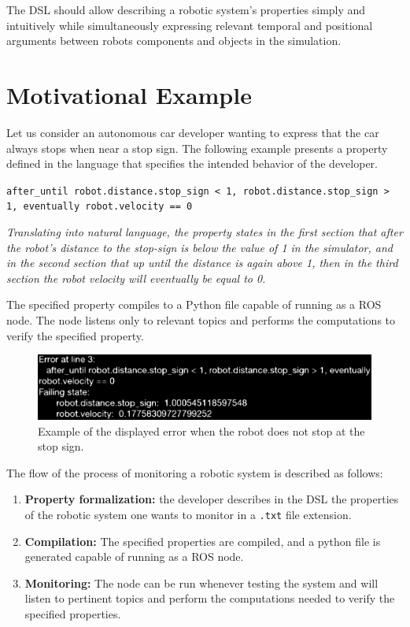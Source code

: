 The DSL should allow describing a robotic system's properties simply and intuitively while simultaneously expressing relevant temporal and positional arguments between robots components and objects in the simulation.


\section{Motivational Example}
\label{sec:motivationalexample}

Let us consider an autonomous car developer wanting to express that the car always stops when near a stop sign. The following example presents a property defined in the language that specifies the intended behavior of the developer.

\texttt{after\_until robot.distance.stop\_sign < 1, robot.distance.stop\_sign > 1, eventually robot.velocity == 0}

\textit{Translating into natural language, the property states in the first section that after the robot's distance to the stop-sign is below the value of 1 in the simulator, and in the second section that up until the distance is again above 1, then in the third section the robot velocity will eventually be equal to 0.}

The specified property compiles to a Python file capable of running as a ROS node. The node listens only to relevant topics and performs the computations to verify the specified property.

\begin{figure}
\includegraphics[width=\textwidth]{images/error.eps}
\caption{Example of the displayed error when the robot does not stop at the stop sign.} \label{fig:error}
\end{figure}

The flow of the process of monitoring a robotic system is described as follows:

\begin{enumerate}[label=(\roman*)]
    \item \textbf{Property formalization:} the developer describes in the DSL the properties of the robotic system one wants to monitor in a \texttt{.txt} file extension.
    \item \textbf{Compilation:} The specified properties are compiled, and a python file is generated capable of running as a ROS node.
    \item \textbf{Monitoring:} The node can be run whenever testing the system and will listen to pertinent topics and perform the computations needed to verify the specified properties.
\end{enumerate}


